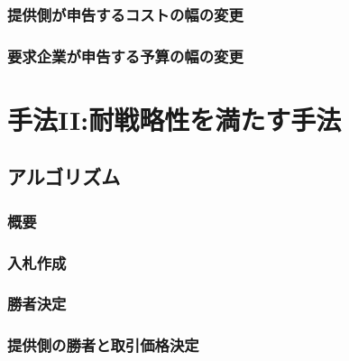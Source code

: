 \hypertarget{ux63d0ux4f9bux5074ux304cux7533ux544aux3059ux308bux30b3ux30b9ux30c8ux306eux5e45ux306eux5909ux66f4}{%
\subsection{提供側が申告するコストの幅の変更}\label{ux63d0ux4f9bux5074ux304cux7533ux544aux3059ux308bux30b3ux30b9ux30c8ux306eux5e45ux306eux5909ux66f4}}

\hypertarget{ux8981ux6c42ux4f01ux696dux304cux7533ux544aux3059ux308bux4e88ux7b97ux306eux5e45ux306eux5909ux66f4}{%
\subsection{要求企業が申告する予算の幅の変更}\label{ux8981ux6c42ux4f01ux696dux304cux7533ux544aux3059ux308bux4e88ux7b97ux306eux5e45ux306eux5909ux66f4}}

\hypertarget{ux624bux6cd5iiux8010ux6226ux7565ux6027ux3092ux6e80ux305fux3059ux624bux6cd5}{%
\chapter{手法II:耐戦略性を満たす手法}\label{ux624bux6cd5iiux8010ux6226ux7565ux6027ux3092ux6e80ux305fux3059ux624bux6cd5}}

\hypertarget{ux30a2ux30ebux30b4ux30eaux30baux30e0-1}{%
\section{アルゴリズム}\label{ux30a2ux30ebux30b4ux30eaux30baux30e0-1}}

\hypertarget{ux6982ux8981-1}{%
\subsection{概要}\label{ux6982ux8981-1}}

\hypertarget{ux5165ux672dux4f5cux6210-1}{%
\subsection{入札作成}\label{ux5165ux672dux4f5cux6210-1}}

\hypertarget{ux52ddux8005ux6c7aux5b9a}{%
\subsection{勝者決定}\label{ux52ddux8005ux6c7aux5b9a}}

\hypertarget{ux63d0ux4f9bux5074ux306eux52ddux8005ux3068ux53d6ux5f15ux4fa1ux683cux6c7aux5b9a}{%
\subsection{提供側の勝者と取引価格決定}\label{ux63d0ux4f9bux5074ux306eux52ddux8005ux3068ux53d6ux5f15ux4fa1ux683cux6c7aux5b9a}}

